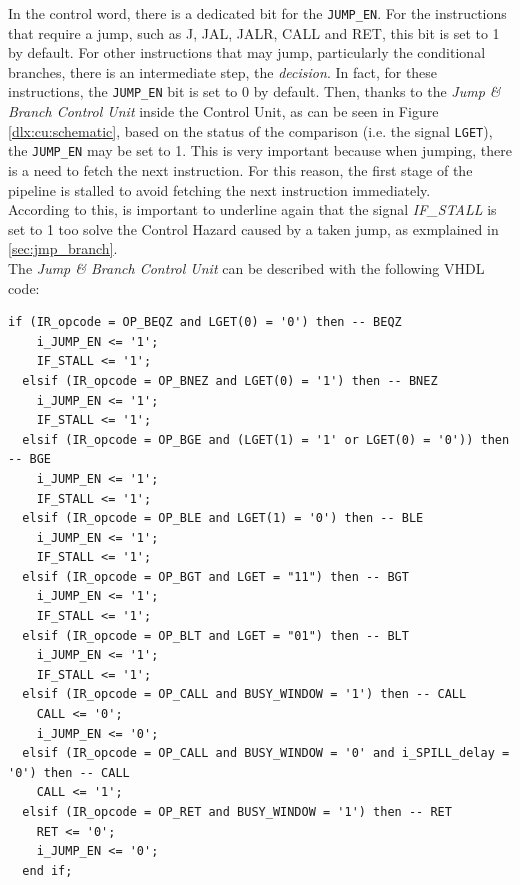 In the control word, there is a dedicated bit for the \texttt{JUMP\_EN}. For the instructions that require a jump, such as J, JAL, JALR, CALL and RET, this bit is set to 1 by default. For other instructions that may jump, particularly the conditional branches, there is an intermediate step, the \emph{decision}. In fact, for these instructions, the \texttt{JUMP\_EN} bit is set to 0 by default. Then, thanks to the \emph{Jump \& Branch Control Unit} inside the Control Unit, as can be seen in Figure \ref{dlx:cu:schematic}, based on the status of the comparison (i.e. the signal \texttt{LGET}), the \texttt{JUMP\_EN} may be set to 1. This is very important because when jumping, there is a need to fetch the next instruction. For this reason, the first stage of the pipeline is stalled to avoid fetching the next instruction immediately.\\ 

According to this, is important to underline again that the signal \emph{IF\_STALL} is set to 1 too solve the Control Hazard caused by a taken jump, as exmplained in \autoref{sec:jmp_branch}.\\

The \emph{Jump \& Branch Control Unit} can be described with the following VHDL code:\\

\begin{lstlisting}[style=vhdl,caption={VHDL code for the conditional branch},label=conditional_branches_code]
  if (IR_opcode = OP_BEQZ and LGET(0) = '0') then -- BEQZ 
    i_JUMP_EN <= '1';
    IF_STALL <= '1';
  elsif (IR_opcode = OP_BNEZ and LGET(0) = '1') then -- BNEZ
    i_JUMP_EN <= '1';
    IF_STALL <= '1';
  elsif (IR_opcode = OP_BGE and (LGET(1) = '1' or LGET(0) = '0')) then -- BGE
    i_JUMP_EN <= '1';
    IF_STALL <= '1';
  elsif (IR_opcode = OP_BLE and LGET(1) = '0') then -- BLE
    i_JUMP_EN <= '1';
    IF_STALL <= '1';
  elsif (IR_opcode = OP_BGT and LGET = "11") then -- BGT
    i_JUMP_EN <= '1';
    IF_STALL <= '1';
  elsif (IR_opcode = OP_BLT and LGET = "01") then -- BLT
    i_JUMP_EN <= '1';
    IF_STALL <= '1';
  elsif (IR_opcode = OP_CALL and BUSY_WINDOW = '1') then -- CALL
    CALL <= '0';
    i_JUMP_EN <= '0';	
  elsif (IR_opcode = OP_CALL and BUSY_WINDOW = '0' and i_SPILL_delay = '0') then -- CALL
    CALL <= '1';
  elsif (IR_opcode = OP_RET and BUSY_WINDOW = '1') then -- RET
    RET <= '0';
    i_JUMP_EN <= '0';
  end if;
\end{lstlisting}


